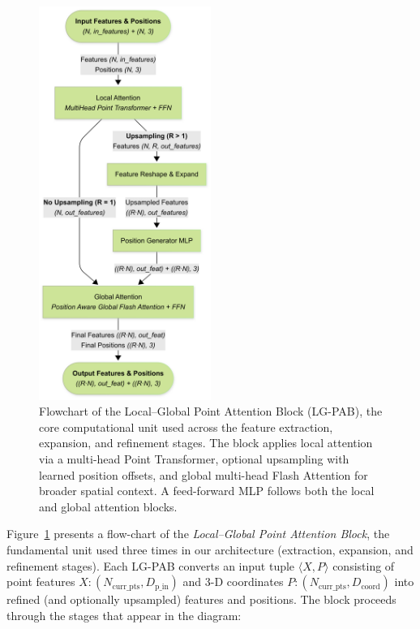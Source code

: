 \documentclass[remotesensing,article,submit,pdftex,moreauthors]{Definitions/mdpi}
\begin{document}
\begin{figure}[!b]
  \centering
  \includegraphics[trim=0mm 0mm 36mm 0mm, clip, width=0.5\textwidth]{manuscript/figures/LG-PAB.png}
  \caption{Flowchart of the Local–Global Point Attention Block (LG-PAB), the core computational unit used across the feature extraction, expansion, and refinement stages. The block applies local attention via a multi-head Point Transformer, optional upsampling with learned position offsets, and global multi-head Flash Attention for broader spatial context. A feed-forward MLP follows both the local and global attention blocks.} 
  \label{fig:lgpab}
\end{figure}

Figure~\ref{fig:lgpab} presents a flow-chart of the \emph{Local–Global Point Attention Block}, the fundamental unit used three times in our architecture (extraction, expansion, and refinement stages).  
Each LG-PAB converts an input tuple $\langle X, P \rangle$ consisting of point features $X: (N_{\text{curr\_pts}}, D_{\text{p\_in}})$ and 3-D coordinates $P: (N_{\text{curr\_pts}}, D_{\text{coord}})$ into refined (and optionally upsampled) features and positions. The block proceeds through the stages that appear in the diagram:
\end{document}
